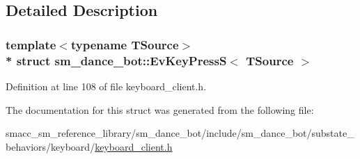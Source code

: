 \subsection{Detailed Description}
\subsubsection*{template$<$typename T\+Source$>$\\*
struct sm\+\_\+dance\+\_\+bot\+::\+Ev\+Key\+Press\+S$<$ T\+Source $>$}



Definition at line 108 of file keyboard\+\_\+client.\+h.



The documentation for this struct was generated from the following file\+:\begin{DoxyCompactItemize}
\item 
smacc\+\_\+sm\+\_\+reference\+\_\+library/sm\+\_\+dance\+\_\+bot/include/sm\+\_\+dance\+\_\+bot/substate\+\_\+behaviors/keyboard/\hyperlink{keyboard__client_8h}{keyboard\+\_\+client.\+h}\end{DoxyCompactItemize}

